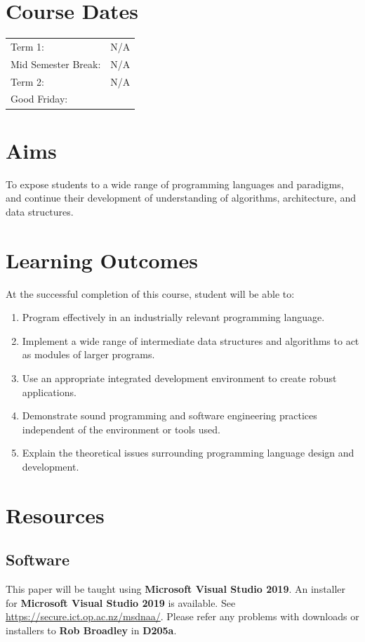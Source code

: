\documentclass{article}
\begin{document}
\section*{Course Dates}
\begin{tabular}{ll}
	Term 1:             & N/A      \\
	Mid Semester Break: & N/A      \\
	Term 2:             & N/A      \\
	Good Friday:        & \nth{10} \\
\end{tabular}

\section*{Aims}
To expose students to a wide range of programming languages and paradigms, and continue their development of understanding of algorithms, architecture, and data structures.

\section*{Learning Outcomes}
At the successful completion of this course, student will be able to:
\begin{enumerate}
	\item Program effectively in an industrially relevant programming language.
	\item Implement a wide range of intermediate data structures and algorithms to act as modules of larger programs.
	\item Use an appropriate integrated development environment to create robust applications.
	\item Demonstrate sound programming and software engineering practices independent of the environment or tools used.
	\item Explain the theoretical issues surrounding programming language design and development.
\end{enumerate}

\section*{Resources}

\subsection*{Software}
This paper will be taught using \textbf{Microsoft Visual Studio 2019}. An installer for \textbf{Microsoft Visual Studio 2019} is available. See \href{https://secure.ict.op.ac.nz/msdnaa/}{https://secure.ict.op.ac.nz/msdnaa/}. Please refer any problems with downloads or installers to \textbf{Rob Broadley} in \textbf{D205a}.
\end{document}
